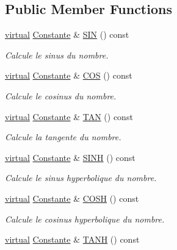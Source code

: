 \subsection*{\-Public \-Member \-Functions}
\begin{DoxyCompactItemize}
\item 
\hyperlink{classvirtual}{virtual} \hyperlink{class_l_o21_1_1_constante}{\-Constante} \& \hyperlink{class_l_o21_1_1_nombre_abf009b9533e0d24f76944ba49372ff52}{\-S\-I\-N} () const 
\begin{DoxyCompactList}\small\item\em \-Calcule le sinus du nombre. \end{DoxyCompactList}\item 
\hyperlink{classvirtual}{virtual} \hyperlink{class_l_o21_1_1_constante}{\-Constante} \& \hyperlink{class_l_o21_1_1_nombre_a791656eaee79d02632d4c9a771c21d3f}{\-C\-O\-S} () const 
\begin{DoxyCompactList}\small\item\em \-Calcule le cosinus du nombre. \end{DoxyCompactList}\item 
\hyperlink{classvirtual}{virtual} \hyperlink{class_l_o21_1_1_constante}{\-Constante} \& \hyperlink{class_l_o21_1_1_nombre_a3281daef643e38927c06ef87ac0d16f9}{\-T\-A\-N} () const 
\begin{DoxyCompactList}\small\item\em \-Calcule la tangente du nombre. \end{DoxyCompactList}\item 
\hyperlink{classvirtual}{virtual} \hyperlink{class_l_o21_1_1_constante}{\-Constante} \& \hyperlink{class_l_o21_1_1_nombre_a551edca4f98fb71ba2b634d8cc2b9b0b}{\-S\-I\-N\-H} () const 
\begin{DoxyCompactList}\small\item\em \-Calcule le sinus hyperbolique du nombre. \end{DoxyCompactList}\item 
\hyperlink{classvirtual}{virtual} \hyperlink{class_l_o21_1_1_constante}{\-Constante} \& \hyperlink{class_l_o21_1_1_nombre_a9c944c852c27897718a54aca53e92bec}{\-C\-O\-S\-H} () const 
\begin{DoxyCompactList}\small\item\em \-Calcule le cosinus hyperbolique du nombre. \end{DoxyCompactList}\item 
\hyperlink{classvirtual}{virtual} \hyperlink{class_l_o21_1_1_constante}{\-Constante} \& \hyperlink{class_l_o21_1_1_nombre_a3085b62b3e4605b7f62cb824aff5309f}{\-T\-A\-N\-H} () const 

\end{DoxyCompactItemize}
